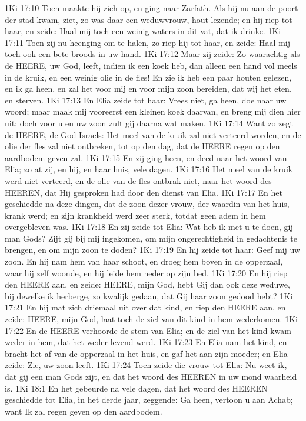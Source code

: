 1Ki 17:10  Toen maakte hij zich op, en ging naar Zarfath. Als hij nu aan de poort der stad kwam, ziet, zo was daar een weduwvrouw, hout lezende; en hij riep tot haar, en zeide: Haal mij toch een weinig waters in dit vat, dat ik drinke.
1Ki 17:11  Toen zij nu heenging om te halen, zo riep hij tot haar, en zeide: Haal mij toch ook een bete broods in uw hand.
1Ki 17:12  Maar zij zeide: Zo waarachtig als de HEERE, uw God, leeft, indien ik een koek heb, dan alleen een hand vol meels in de kruik, en een weinig olie in de fles! En zie ik heb een paar houten gelezen, en ik ga heen, en zal het voor mij en voor mijn zoon bereiden, dat wij het eten, en sterven.
1Ki 17:13  En Elia zeide tot haar: Vrees niet, ga heen, doe naar uw woord; maar maak mij vooreerst een kleinen koek daarvan, en breng mij dien hier uit; doch voor u en uw zoon zult gij daarna wat maken.
1Ki 17:14  Want zo zegt de HEERE, de God Israels: Het meel van de kruik zal niet verteerd worden, en de olie der fles zal niet ontbreken, tot op den dag, dat de HEERE regen op den aardbodem geven zal.
1Ki 17:15  En zij ging heen, en deed naar het woord van Elia; zo at zij, en hij, en haar huis, vele dagen.
1Ki 17:16  Het meel van de kruik werd niet verteerd, en de olie van de fles ontbrak niet, naar het woord des HEEREN, dat Hij gesproken had door den dienst van Elia.
1Ki 17:17  En het geschiedde na deze dingen, dat de zoon dezer vrouw, der waardin van het huis, krank werd; en zijn krankheid werd zeer sterk, totdat geen adem in hem overgebleven was.
1Ki 17:18  En zij zeide tot Elia: Wat heb ik met u te doen, gij man Gods? Zijt gij bij mij ingekomen, om mijn ongerechtigheid in gedachtenis te brengen, en om mijn zoon te doden?
1Ki 17:19  En hij zeide tot haar: Geef mij uw zoon. En hij nam hem van haar schoot, en droeg hem boven in de opperzaal, waar hij zelf woonde, en hij leide hem neder op zijn bed.
1Ki 17:20  En hij riep den HEERE aan, en zeide: HEERE, mijn God, hebt Gij dan ook deze weduwe, bij dewelke ik herberge, zo kwalijk gedaan, dat Gij haar zoon gedood hebt?
1Ki 17:21  En hij mat zich driemaal uit over dat kind, en riep den HEERE aan, en zeide: HEERE, mijn God, laat toch de ziel van dit kind in hem wederkomen.
1Ki 17:22  En de HEERE verhoorde de stem van Elia; en de ziel van het kind kwam weder in hem, dat het weder levend werd.
1Ki 17:23  En Elia nam het kind, en bracht het af van de opperzaal in het huis, en gaf het aan zijn moeder; en Elia zeide: Zie, uw zoon leeft.
1Ki 17:24  Toen zeide die vrouw tot Elia: Nu weet ik, dat gij een man Gods zijt, en dat het woord des HEEREN in uw mond waarheid is.
1Ki 18:1  En het gebeurde na vele dagen, dat het woord des HEEREN geschiedde tot Elia, in het derde jaar, zeggende: Ga heen, vertoon u aan Achab; want Ik zal regen geven op den aardbodem.
